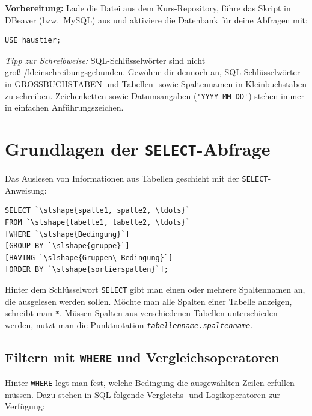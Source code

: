 \noindent \textbf{Vorbereitung:} Lade die Datei  aus dem
Kurs-Repository, führe das Skript in DBeaver (bzw.\ MySQL) aus und aktiviere die
Datenbank für deine Abfragen mit:

\begin{lstlisting}
USE haustier;
\end{lstlisting}

\noindent \emph{Tipp zur Schreibweise:} SQL-Schlüsselwörter sind nicht
groß-/kleinschreibungsgebunden. Gewöhne dir dennoch an, SQL-Schlüsselwörter in
GROSSBUCHSTABEN und Tabellen- sowie Spaltennamen in Kleinbuchstaben zu
schreiben. Zeichenketten sowie Datumsangaben (\lstinline|'YYYY-MM-DD'|) stehen
immer in einfachen Anführungszeichen.


\section{Grundlagen der \texttt{SELECT}-Abfrage}

Das Auslesen von Informationen aus Tabellen geschieht mit der
\lstinline|SELECT|-Anweisung:

\begin{lstlisting}
SELECT `\slshape{spalte1, spalte2, \ldots}`
FROM `\slshape{tabelle1, tabelle2, \ldots}`
[WHERE `\slshape{Bedingung}`]
[GROUP BY `\slshape{gruppe}`]
[HAVING `\slshape{Gruppen\_Bedingung}`]
[ORDER BY `\slshape{sortierspalten}`];
\end{lstlisting}

Hinter dem Schlüsselwort \lstinline|SELECT| gibt man einen oder mehrere
Spaltennamen an, die ausgelesen werden sollen. Möchte man alle Spalten einer
Tabelle anzeigen, schreibt man \lstinline|*|. Müssen Spalten aus verschiedenen
Tabellen unterschieden werden, nutzt man die Punktnotation
\texttt{\slshape{tabellenname.spaltenname}}.

\subsection{Filtern mit \texttt{WHERE} und Vergleichsoperatoren}

Hinter \lstinline|WHERE| legt man fest, welche Bedingung die ausgewählten Zeilen
erfüllen müssen. Dazu stehen in SQL folgende Vergleichs- und Logikoperatoren zur
Verfügung:


